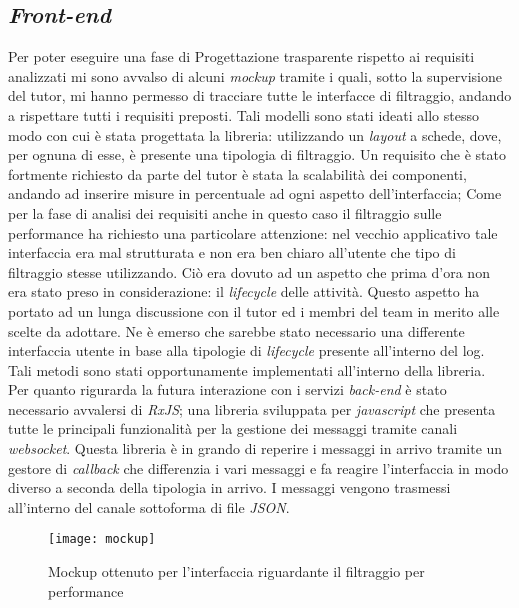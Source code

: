 \subsection{\textit{Front-end}}
Per poter eseguire una fase di Progettazione trasparente rispetto ai requisiti analizzati mi sono avvalso di alcuni \textit{\gls{mockup}} tramite i quali, sotto la supervisione del tutor, mi hanno permesso di tracciare tutte le interfacce di filtraggio, andando a rispettare tutti i requisiti preposti. Tali modelli sono stati ideati allo stesso modo con cui è stata progettata la libreria: utilizzando un \textit{layout} a schede, dove, per ognuna di esse, è presente una tipologia di filtraggio. Un requisito che è stato fortmente richiesto da parte del tutor è stata la scalabilità dei componenti, andando ad inserire misure in percentuale ad ogni aspetto dell'interfaccia; Come per la fase di analisi dei requisiti anche in questo caso il filtraggio sulle performance ha richiesto una particolare attenzione: nel vecchio applicativo tale interfaccia era mal strutturata e non era ben chiaro all'utente che tipo di filtraggio stesse utilizzando. Ciò era dovuto ad un aspetto che prima d'ora non era stato preso in considerazione: il \textit{lifecycle} delle attività. Questo aspetto ha portato ad un lunga discussione con il tutor ed i membri del team in merito alle scelte da adottare. Ne è emerso che sarebbe stato necessario una differente interfaccia utente in base alla tipologie di \textit{lifecycle} presente all'interno del log. Tali metodi sono stati opportunamente implementati all'interno della libreria.\\
Per quanto rigurarda la futura interazione con i servizi \textit{back-end} è stato necessario avvalersi di \textit{RxJS}; una libreria sviluppata per \textit{javascript} che presenta tutte le principali funzionalità per la gestione dei messaggi tramite canali \textit{websocket}. Questa libreria è in grando di reperire i messaggi in arrivo tramite un gestore di \textit{callback} che differenzia i vari messaggi e fa reagire l'interfaccia in modo diverso a seconda della tipologia in arrivo. I messaggi vengono trasmessi all'interno del canale sottoforma di file \textit{\gls{JSON}}.
\begin{figure}[!h] 
	\centering 
	\texttt{[image: mockup]} 
	\caption{Mockup ottenuto per l'interfaccia riguardante il filtraggio per performance}
\end{figure}
